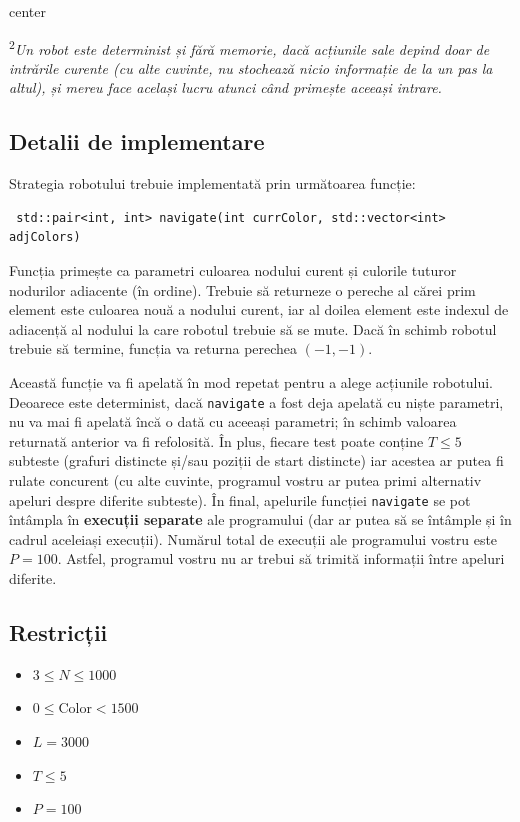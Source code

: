\documentclass[12pt]{article}
\begin{document}
\begin{adjustbox}{center}
	
\end{adjustbox}

\textsuperscript{2}\textit{Un robot este determinist și fără memorie, dacă acțiunile sale depind doar de intrările curente (cu alte cuvinte, nu stochează nicio informație de la un pas la altul), și mereu face același lucru atunci când primește aceeași intrare.}

\subsection{Detalii de implementare}
Strategia robotului trebuie implementată prin următoarea funcție:
\begin{lstlisting}
 std::pair<int, int> navigate(int currColor, std::vector<int> adjColors)
\end{lstlisting}

Funcția primește ca parametri culoarea nodului curent și culorile tuturor nodurilor adiacente (în ordine). Trebuie să returneze o pereche al cărei prim element este culoarea nouă a nodului curent, iar al doilea element este indexul de adiacență al nodului la care robotul trebuie să se mute. Dacă în schimb robotul trebuie să termine, funcția va returna perechea $(-1, -1)$.

Această funcție va fi apelată în mod repetat pentru a alege acțiunile robotului. Deoarece este determinist, dacă \texttt{navigate} a fost deja apelată cu niște parametri, nu va mai fi apelată încă o dată cu aceeași parametri; în schimb valoarea returnată anterior va fi refolosită. În plus, fiecare test poate conține $T \leq 5$ subteste (grafuri distincte și/sau poziții de start distincte) iar acestea ar putea fi rulate concurent (cu alte cuvinte, programul vostru ar putea primi alternativ apeluri despre diferite subteste). În final, apelurile funcției \texttt{navigate} se pot întâmpla în \textbf{execuții separate} ale programului (dar ar putea să se întâmple și în cadrul aceleiași execuții). Numărul total de execuții ale programului vostru este $P = 100$. Astfel, programul vostru nu ar trebui să trimită informații între apeluri diferite.

\subsection{Restricții}

\begin{itemize}
\item $3 \leq N \leq 1000$
\item $0 \leq \mathrm{Color} < 1500$
\item $L = 3000$
\item $T \leq 5$
\item $P = 100$
\end{itemize}
\end{document}
